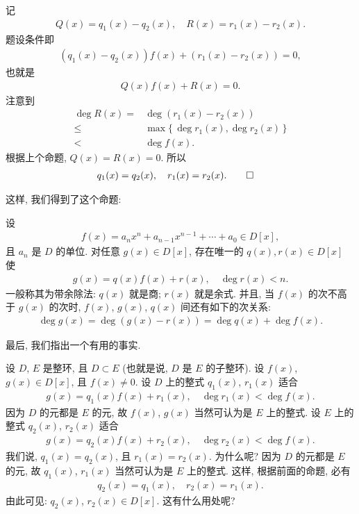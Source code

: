 \begin{pf}
    记
    \begin{align*}
        Q(x) = q_1 (x) - q_2 (x), \quad R(x) = r_1 (x) - r_2 (x).
    \end{align*}
    题设条件即
    \begin{align*}
        (q_1 (x) - q_2 (x)) f(x) + (r_1 (x) - r_2 (x)) = 0,
    \end{align*}
    也就是
    \begin{align*}
        Q(x) f(x) + R(x) = 0.
    \end{align*}
    注意到
    \begin{align*}
        \deg R(x)
        =    {} & \deg {(r_1 (x) - r_2 (x))}                \\
        \leq {} & \max \{\, \deg r_1 (x), \deg r_2 (x) \,\} \\
        <    {} & \deg f(x).
    \end{align*}
    根据上个命题, $Q(x) = R(x) = 0$. 所以
    \begin{align*}
         & q_1 (x) = q_2 (x), \quad r_1 (x) = r_2 (x). \qedhere
    \end{align*}
\end{pf}

这样, 我们得到了这个命题:

\begin{proposition}
    设
    \begin{align*}
        f(x) = a_n x^n + a_{n-1} x^{n-1} + \cdots + a_0 \in D[x],
    \end{align*}
    且 $a_n$ 是 $D$ 的单位. 对任意 $g(x) \in D[x]$, 存在唯一的 $q(x), r(x) \in D[x]$ 使
    \begin{align*}
        g(x) = q(x) f(x) + r(x), \quad \deg r(x) < n.
    \end{align*}
    一般称其为带余除法: $q(x)$ 就是商; $r(x)$ 就是余式. 并且, 当 $f(x)$ 的次不高于 $g(x)$ 的次时, $f(x)$, $g(x)$, $q(x)$ 间还有如下的次关系:
    \begin{align*}
        \deg g(x) = \deg {(g(x) - r(x))} = \deg q(x) + \deg f(x).
    \end{align*}
\end{proposition}

最后, 我们指出一个有用的事实.

设 $D$, $E$ 是整环, 且 $D \subset E$ (也就是说, $D$ 是 $E$ 的子整环). 设 $f(x)$, $g(x) \in D[x]$, 且 $f(x) \neq 0$. 设 $D$ 上的整式 $q_1 (x)$, $r_1 (x)$ 适合
\begin{align*}
    g(x) = q_1 (x) f(x) + r_1 (x), \quad \deg r_1 (x) < \deg f(x).
\end{align*}
因为 $D$ 的元都是 $E$ 的元, 故 $f(x)$, $g(x)$ 当然可认为是 $E$ 上的整式. 设 $E$ 上的整式 $q_2 (x)$, $r_2 (x)$ 适合
\begin{align*}
    g(x) = q_2 (x) f(x) + r_2 (x), \quad \deg r_2 (x) < \deg f(x).
\end{align*}
我们说, $q_1 (x) = q_2 (x)$, 且 $r_1 (x) = r_2 (x)$. 为什么呢? 因为 $D$ 的元都是 $E$ 的元, 故 $q_1 (x)$, $r_1 (x)$ 当然可认为是 $E$ 上的整式. 这样, 根据前面的命题, 必有
\begin{align*}
    q_2 (x) = q_1 (x), \quad r_2 (x) = r_1 (x).
\end{align*}
由此可见: $q_2 (x)$, $r_2 (x) \in D[x]$. 这有什么用处呢?

